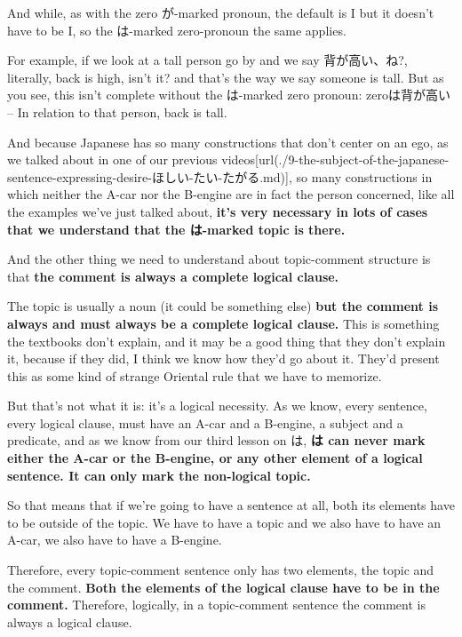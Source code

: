 And while, as with the zero が-marked pronoun, the default is I but it doesn't have to be I, so the は-marked zero-pronoun the same applies.

For example, if we look at a tall person go by and we say 背が高い、ね?, literally, back is high, isn't it? and that's the way we say someone is tall. But as you see, this isn't complete without the は-marked zero pronoun: zeroは背が高い -- In relation to that person, back is tall.

And because Japanese has so many constructions that don't center on an ego, as we talked about in one of our previous videos\goto{{[}9{]}}[url(./9-the-subject-of-the-japanese-sentence-expressing-desire-ほしい-たい-たがる.md)], so many constructions in which neither the A-car nor the B-engine are in fact the person concerned, like all the examples we've just talked about, {\bf it's very necessary in lots of cases that we understand that the は-marked topic is there.}

And the other thing we need to understand about topic-comment structure is that {\bf the comment is always a complete logical clause.}

{}

The topic is usually a noun (it could be something else) {\bf but the comment is always and must always be a complete logical clause.} This is something the textbooks don't explain, and it may be a good thing that they don't explain it, because if they did, I think we know how they'd go about it. They'd present this as some kind of strange Oriental rule that we have to memorize.

But that's not what it is: it's a logical necessity. As we know, every sentence, every logical clause, must have an A-car and a B-engine, a subject and a predicate,\crlf
and as we know from our third lesson on は, {\bf は can never mark either the A-car or the B-engine, or any other element of a logical sentence. It can only mark the non-logical topic.}

So that means that if we're going to have a sentence at all, both its elements have to be outside of the topic. We have to have a topic and we also have to have an A-car, we also have to have a B-engine.

\thinrule

Therefore, every topic-comment sentence only has two elements, the topic and the comment. {\bf Both the elements of the logical clause have to be in the comment.} Therefore, logically, in a topic-comment sentence the comment is always a logical clause.

